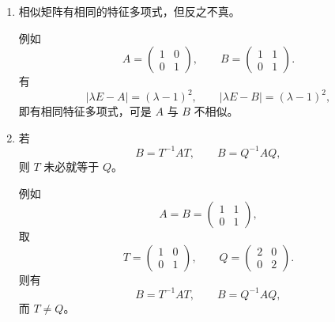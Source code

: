 \begin{enumerate}
\item 相似矩阵有相同的特征多项式，但反之不真。

例如
\[
 A=\begin{pmatrix}1&0\\0&1\end{pmatrix},\qquad
 B=\begin{pmatrix}1&1\\0&1\end{pmatrix}.
\]
有
\[
 |\lambda E-A|=(\lambda-1)^2,
\qquad
 |\lambda E-B|=(\lambda-1)^2,
\]
即有相同特征多项式，可是 $A$ 与 $B$ 不相似。

\item 若
\[
 B=T^{-1}AT,
\qquad
 B=Q^{-1}AQ,
\]
则 $T$ 未必就等于 $Q$。

例如
\[
 A=B=\begin{pmatrix}1&1\\0&1\end{pmatrix},
\]
取
\[
 T=\begin{pmatrix}1&0\\0&1\end{pmatrix},\qquad
 Q=\begin{pmatrix}2&0\\0&2\end{pmatrix}.
\]
则有
\[
 B=T^{-1}AT,
\qquad
 B=Q^{-1}AQ,
\]
而 $T\ne Q$。
\end{enumerate}
